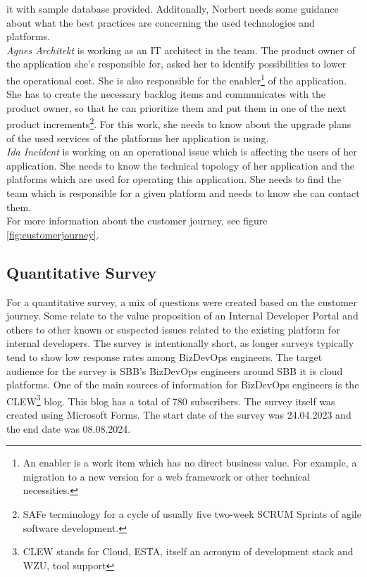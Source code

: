 \documentclass[a4paper,12pt]{article}
\begin{document}
    it with sample database provided.
    Additonally, Norbert needs some guidance about what the best practices are concerning the used technologies and platforms.\\
    \textit{Agnes Architekt} is working as an IT architect in the team.
    The product owner of the application she's responsible for, asked her to identify possibilities to lower the operational cost.
    She is also responsible for the enabler\footnote{An enabler is a work item which has no direct business value.
    For example, a migration to a new version for a web framework or other technical necessities.} of the application.
    She has to create the necessary backlog items and communicates with the product owner, so that he can prioritize
    them and put them in one of the next product increments\footnote{SAFe terminology for a cycle of usually five two-week SCRUM Sprints of agile software development.}.
    For this work, she needs to know about the upgrade plans of the used services of the platforms her application is using.     \\
    \textit{Ida Incident} is working on an operational issue which is affecting the users of her application.
    She needs to know the technical topology of her application and the platforms which are used for operating this application.
    She needs to find the team which is responsible for a given platform and needs to know she can contact them.\\
    For more information about the customer journey, see figure \ref{fig:customerjourney}.

    \subsection{Quantitative Survey}
    \label{subsec:quansur}
    For a quantitative survey, a mix of questions were created based on the customer journey.
    Some relate to the value proposition of an Internal Developer Portal and others to other known or suspected issues
    related to the existing platform for internal developers.
    The survey is intentionally short, as longer surveys typically tend to show low response rates among BizDevOps engineers.
    The target audience for the survey is SBB's BizDevOps engineers around SBB it is cloud platforms.
    One of the main sources of information for BizDevOps engineers is the CLEW\footnote{CLEW stands for Cloud, ESTA,
        itself an acronym of development stack and WZU, tool support} blog.
    This blog has a total of 780 subscribers.
    The survey itself was created using Microsoft Forms.
    The start date of the survey was 24.04.2023 and the end date was 08.08.2024.
\end{document}
